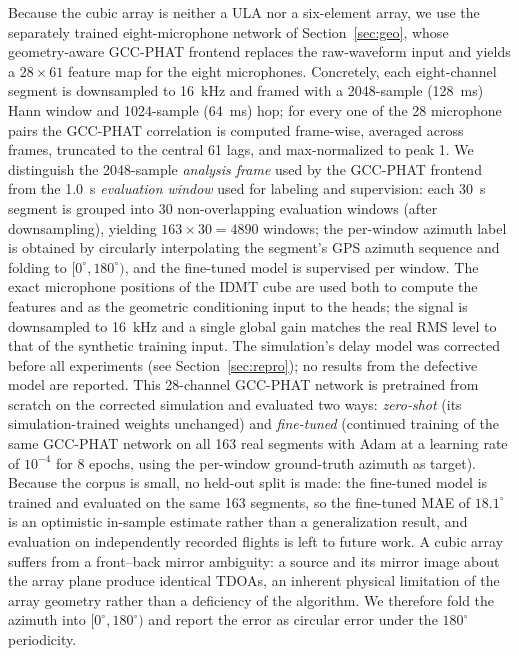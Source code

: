 \documentclass[sensors,article,submit,pdftex,moreauthors]{Definitions/mdpi}
\begin{document}
Because the cubic array is neither a ULA nor a six-element array, we use the separately trained eight-microphone network of Section~\ref{sec:geo}, whose geometry-aware GCC-PHAT frontend replaces the raw-waveform input and yields a $28\times 61$ feature map for the eight microphones. Concretely, each eight-channel segment is downsampled to \SI{16}{\kilo\hertz} and framed with a \SI{2048}{}-sample (\SI{128}{\milli\second}) Hann window and \SI{1024}{}-sample (\SI{64}{\milli\second}) hop; for every one of the 28 microphone pairs the GCC-PHAT correlation is computed frame-wise, averaged across frames, truncated to the central 61 lags, and max-normalized to peak 1. We distinguish the \SI{2048}{}-sample \emph{analysis frame} used by the GCC-PHAT frontend from the \SI{1.0}{\second} \emph{evaluation window} used for labeling and supervision: each \SI{30}{\second} segment is grouped into 30 non-overlapping evaluation windows (after downsampling), yielding $163\times30=4890$ windows; the per-window azimuth label is obtained by circularly interpolating the segment's GPS azimuth sequence and folding to $[0^\circ,180^\circ)$, and the fine-tuned model is supervised per window. The exact microphone positions of the IDMT cube are used both to compute the features and as the geometric conditioning input to the heads; the signal is downsampled to \SI{16}{\kilo\hertz} and a single global gain matches the real RMS level to that of the synthetic training input. The simulation's delay model was corrected before all experiments (see Section~\ref{sec:repro}); no results from the defective model are reported. This 28-channel GCC-PHAT network is pretrained from scratch on the corrected simulation and evaluated two ways: \emph{zero-shot} (its simulation-trained weights unchanged) and \emph{fine-tuned} (continued training of the same GCC-PHAT network on all 163 real segments with Adam at a learning rate of $10^{-4}$ for $8$ epochs, using the per-window ground-truth azimuth as target). Because the corpus is small, no held-out split is made: the fine-tuned model is trained and evaluated on the same 163 segments, so the fine-tuned MAE of $18.1^\circ$ is an optimistic in-sample estimate rather than a generalization result, and evaluation on independently recorded flights is left to future work. A cubic array suffers from a front--back mirror ambiguity: a source and its mirror image about the array plane produce identical TDOAs, an inherent physical limitation of the array geometry rather than a deficiency of the algorithm. We therefore fold the azimuth into $[0^\circ,180^\circ)$ and report the error as circular error under the $180^\circ$\, periodicity.
\end{document}
